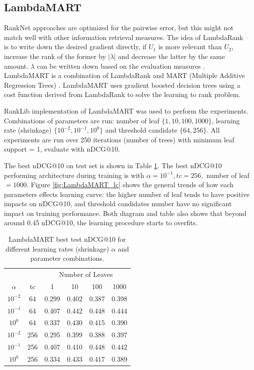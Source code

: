 \documentclass[english]{article}
\theoremstyle{definition}
\begin{document}
\begin{multicols}{2}
\subsection{LambdaMART}

RankNet approaches are optimized for the pairwise error, but this might not match well with other information retrieval measures. The idea of LambdaRank is to write down the desired gradient directly, if $U_1$ is more relevant than $U_2$, increase the rank of the former by $|\lambda|$ and decrease the latter by the same amount. $\lambda$ can be written down based on the evaluation measures \cite{burges2010ranknet}. 
LambdaMART is a combination of LambdaRank and MART (Multiple Additive Regression Trees) \cite{mart}. LambdaMART uses gradient boosted decision trees using a cost function derived from LambdaRank to solve the learning to rank problem.


RankLib \cite{Lemur} implementation of LambdaMART was used to perform the experiments. Combinations of parameters are run: number of leaf $\{1,10,100,1000\}$, learning rate (shrinkage) $\{10^{-2}, 10^{-1}, 10^{0}\}$ and threshold candidate $\{64,256\}$. All experiments are run over 250 iterations (number of trees) with minimum leaf support = 1, evaluate with nDCG@10.

The best nDCG@10 on test set is shown in Table \ref{tab:LambdaMART_train}. The best nDCG@10 performing architecture during training is with $\alpha = 10^{-1}, tc = 256,$ number of leaf $= 1000$. Figure \ref{fig:LambdaMART_lc} shows the general trends of how each parameters effects learning curve: the higher number of leaf tends to have positive impacts on nDCG@10, and threshold candidates number have no significant impact on training performance. Both diagram and table also shows that beyond around 0.45 nDCG@10, the learning procedure starts to overfits. 

\begin{table}[H]
\begin{center}
\begin{tabular}{c c c c c c}
  \hline
  {} & {} & \multicolumn{4}{c}{Number of Leaves}\\
  $\alpha$ & tc & 1 & 10 & 100 & 1000\\
  \hline
  $10^{-2}$ & 64 & 0.299 & 0.402 & 0.387 & 0.398 \\
  $10^{-1}$ & 64 & 0.407 & 0.442 & 0.448 & 0.444 \\
  $10^{0}$ & 64 & 0.337 & 0.430 & 0.415 & 0.390 \\
  \hline
  $10^{-2}$ & 256 & 0.295 & 0.399 & 0.388 & 0.397 \\
  $10^{-1}$ & 256 & 0.407 & 0.410 & 0.448 & 0.442 \\
  $10^{0}$ & 256 & 0.334 & 0.433 & 0.417 & 0.389 \\
  \hline
\end{tabular}
\caption{\label{tab:LambdaMART_train}LambdaMART best test nDCG@10 for different learning rates (shrinkage) $\alpha$ and parameter combinations.}
\end{center}
\end{table}


\end{multicols}
\end{document}
